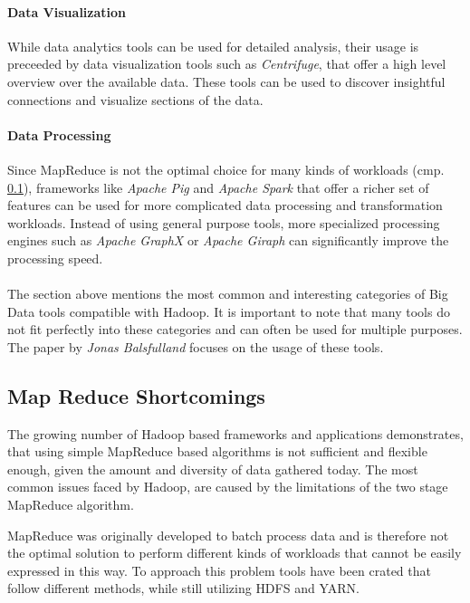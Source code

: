 \paragraph{Data Visualization}
While data analytics tools can be used for detailed analysis, 
their usage is preceeded by data visualization tools such as \emph{Centrifuge}, 
that offer a high level overview over the available data. 
These tools can be used to discover insightful connections and visualize sections of the data.

\paragraph{Data Processing}
Since MapReduce is not the optimal choice for many kinds of workloads (cmp. \ref{sec:fund:mapred_shortcomings}), frameworks like \emph{Apache Pig} and \emph{Apache Spark} that offer a richer set of features can be used for more complicated data processing and transformation workloads. Instead of using general purpose tools, more specialized processing engines such as \emph{Apache GraphX} or \emph{Apache Giraph} can significantly improve the processing speed.

\paragraph{}
The section above mentions the most common and interesting categories of Big Data tools compatible with Hadoop. It is important to note that many tools do not fit perfectly into these categories and can often be used for multiple purposes.
The paper by \emph{Jonas Balsfulland} focuses on the usage of these tools.

\subsection{Map Reduce Shortcomings}
\label{sec:fund:mapred_shortcomings}

The growing number of Hadoop based frameworks and applications demonstrates, that using simple MapReduce based algorithms is not sufficient and flexible enough, given the amount and diversity of data gathered today. The most common issues faced by Hadoop, are caused by the limitations of the two stage MapReduce algorithm.\autocite[][]{6903263} 

MapReduce was originally developed to batch process data and is
therefore not the optimal solution to perform different kinds of
workloads that cannot be easily expressed in this
way.\autocite{computers3040117}
To approach this problem tools have been crated that follow different methods, while still utilizing \ac{HDFS} and \ac{YARN}.

